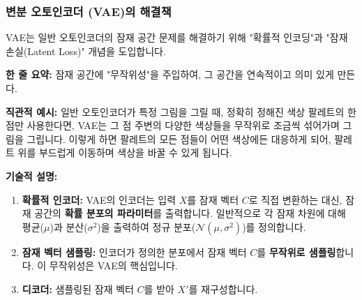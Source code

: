\documentclass[11pt,a4paper]{article}
\begin{document}
\subsubsection{변분 오토인코더 (VAE)의 해결책}
VAE는 일반 오토인코더의 잠재 공간 문제를 해결하기 위해 "확률적 인코딩"과 "잠재 손실(Latent Loss)" 개념을 도입합니다.

\begin{tcolorbox}[conceptbox, title=변분 오토인코더 (VAE)의 핵심 아이디어]
\textbf{한 줄 요약:} 잠재 공간에 "무작위성"을 주입하여, 그 공간을 연속적이고 의미 있게 만든다.

\textbf{직관적 예시:} 일반 오토인코더가 특정 그림을 그릴 때, 정확히 정해진 색상 팔레트의 한 점만 사용한다면, VAE는 그 점 주변의 다양한 색상들을 무작위로 조금씩 섞어가며 그림을 그립니다. 이렇게 하면 팔레트의 모든 점들이 어떤 색상에든 대응하게 되어, 팔레트 위를 부드럽게 이동하며 색상을 바꿀 수 있게 됩니다.

\textbf{기술적 설명:}
\begin{enumerate}
    \item \textbf{확률적 인코더:} VAE의 인코더는 입력 $X$를 잠재 벡터 $C$로 직접 변환하는 대신, 잠재 공간의 \textbf{확률 분포의 파라미터}를 출력합니다. 일반적으로 각 잠재 차원에 대해 평균($\mu$)과 분산($\sigma^2$)을 출력하여 정규 분포($\mathcal{N}(\mu, \sigma^2)$)를 정의합니다.
    \item \textbf{잠재 벡터 샘플링:} 인코더가 정의한 분포에서 잠재 벡터 $C$를 \textbf{무작위로 샘플링}합니다. 이 무작위성은 VAE의 핵심입니다.
    \item \textbf{디코더:} 샘플링된 잠재 벡터 $C$를 받아 $X'$를 재구성합니다.
\end{enumerate}
\end{tcolorbox}
\end{document}
